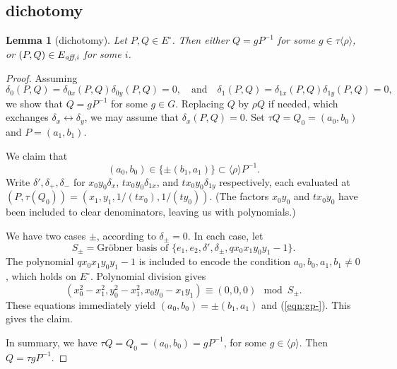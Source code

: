 \documentclass[12pt]{article}
\newtheorem{lemma}[theorem]{Lemma}
\newcommand{\op}[1]{\hbox{#1}}
\newcommand{\Eaf}[1]{E_{\op{\scriptsize\it aff},{#1}}}
\newcommand{\Eoo}{E^{\circ}}
\newcommand{\Go}{\langle\rho\rangle}
\newcommand{\ang}[1]{\langle{#1}\rangle}
\def\cong{\equiv}
\begin{document}
\subsection{dichotomy}

\begin{lemma}[dichotomy]\label{lemma:noco} 
  Let $P,Q\in \Eoo$.  Then either $Q=g P^{-1}$ for some $g\in
  \tau\ang{\rho}$, or $(P,Q)\in \Eaf{i}$ for some $i$.
\end{lemma}

\begin{proof} 
  Assuming
  \[
  \delta_0(P,Q) = \delta_{0x}(P,Q)\delta_{0y}(P,Q)=0,\quad\text{and}\quad
  \delta_1(P,Q) = \delta_{1x}(P,Q)\delta_{1y}(P,Q)=0,
  \]
  we show that $Q = g P^{-1}$ for some $g\in G$.
  Replacing $Q$ by $\rho Q$ if needed, which exchanges
  $\delta_x\leftrightarrow \delta_y$, we may assume that
  $\delta_x(P,Q)=0$.  Set $\tau Q = Q_0 = (a_0,b_0)$ and
  $P=(a_1,b_1)$.  

We claim that
\begin{equation}\label{eqn:gp-}
(a_0,b_0) \in \{\pm (b_1,a_1)\} \subset \Go P^{-1}.
\end{equation}
Write $\delta',\delta_{+},\delta_{-}$ for $x_0 y_0\delta_x$,
$t x_0 y_0\delta_{1x}$, and $t x_0 y_0 \delta_{1y}$ respectively,
each evaluated at $(P,\tau(Q_0))=(x_1,y_1,1/(t x_0),1/(t y_0))$. 
(The factors $x_0y_0$
and $t x_0 y_0$ have been included to clear denominators, leaving us
with polynomials.)

We have two cases $\pm$, according to $\delta_{\pm}=0$.
In each case, let
\[
S_\pm = \text{Gr\"obner basis of } \{e_1,e_2, 
\delta',\delta_{\pm},q x_0 x_1 y_0 y_1 - 1\}.
\]
The polynomial $q x_0 x_1 y_0 y_1-1$ is included to encode the
condition $a_0,b_0,a_1,b_1\ne 0$, which holds on $\Eoo$.  Polynomial
division gives
\begin{equation}\label{eqn:dichot}
(x_0^2-x_1^2,y_0^2-x_1^2,x_0 y_0 - x_1 y_1) \cong (0,0,0) \mod S_\pm.
\end{equation}
These equations immediately yield $(a_0,b_0) = \pm (b_1,a_1)$ and
(\ref{eqn:gp-}).  This gives the claim.


In summary, we have $\tau Q = Q_0 = (a_0,b_0) = g P^{-1}$, for some
$g\in \Go$.  Then $Q = \tau g P^{-1}$.
\end{proof}
\end{document}
